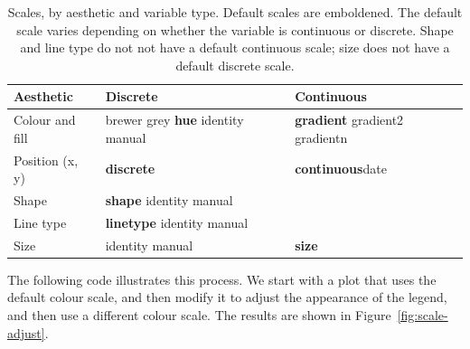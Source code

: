 \begin{table}
  \begin{center}
  \begin{tabular}{p{1in}p{1in}p{1in}}
    \toprule
    Aesthetic & Discrete & Continuous \\
    \midrule
    Colour and fill & brewer \newline grey \newline \textbf{hue} \newline identity \newline manual & \textbf{gradient} \newline gradient2 \newline gradientn \\[0.5em]
    Position (x, y) & \textbf{discrete} & \textbf{continuous}\newline date \\[0.5em]
    Shape & \textbf{shape} \newline identity \newline manual  \\[0.5em]
    Line type & \textbf{linetype} \newline identity \newline manual \\[0.5em]
    Size & identity \newline manual & \textbf{size} \\
    \bottomrule
  \end{tabular}
  \end{center}
  \caption{Scales, by aesthetic and variable type.  Default scales are emboldened. The default scale varies depending on whether the variable is continuous or discrete.  Shape and line type do not not have a default continuous scale; size does not have a default discrete scale.}
  \label{tbl:default-scales}
\end{table}

The following code illustrates this process.  We start with a plot that uses the default colour scale, and then modify it to adjust the appearance of the legend, and then use a different colour scale.  The results are shown in Figure~\ref{fig:scale-adjust}.

% 
% 
% 


